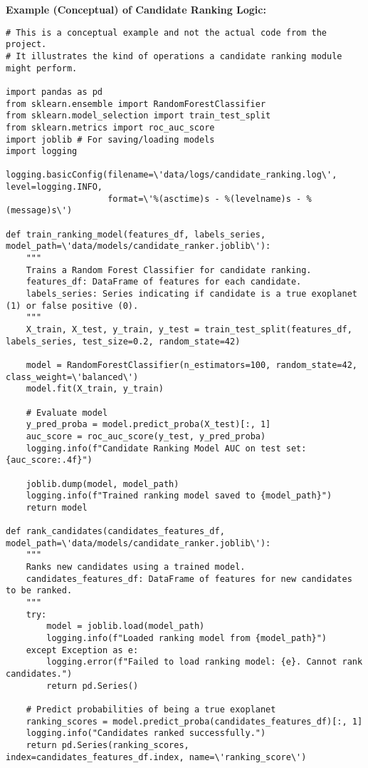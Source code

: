\documentclass{article}
\begin{document}
\textbf{Example (Conceptual) of Candidate Ranking Logic:}
\begin{lstlisting}[caption={Conceptual Candidate Ranking Logic}]
# This is a conceptual example and not the actual code from the project.
# It illustrates the kind of operations a candidate ranking module might perform.

import pandas as pd
from sklearn.ensemble import RandomForestClassifier
from sklearn.model_selection import train_test_split
from sklearn.metrics import roc_auc_score
import joblib # For saving/loading models
import logging

logging.basicConfig(filename=\'data/logs/candidate_ranking.log\', level=logging.INFO,
                    format=\'%(asctime)s - %(levelname)s - %(message)s\')

def train_ranking_model(features_df, labels_series, model_path=\'data/models/candidate_ranker.joblib\'):
    """
    Trains a Random Forest Classifier for candidate ranking.
    features_df: DataFrame of features for each candidate.
    labels_series: Series indicating if candidate is a true exoplanet (1) or false positive (0).
    """
    X_train, X_test, y_train, y_test = train_test_split(features_df, labels_series, test_size=0.2, random_state=42)

    model = RandomForestClassifier(n_estimators=100, random_state=42, class_weight=\'balanced\')
    model.fit(X_train, y_train)

    # Evaluate model
    y_pred_proba = model.predict_proba(X_test)[:, 1]
    auc_score = roc_auc_score(y_test, y_pred_proba)
    logging.info(f"Candidate Ranking Model AUC on test set: {auc_score:.4f}")

    joblib.dump(model, model_path)
    logging.info(f"Trained ranking model saved to {model_path}")
    return model

def rank_candidates(candidates_features_df, model_path=\'data/models/candidate_ranker.joblib\'):
    """
    Ranks new candidates using a trained model.
    candidates_features_df: DataFrame of features for new candidates to be ranked.
    """
    try:
        model = joblib.load(model_path)
        logging.info(f"Loaded ranking model from {model_path}")
    except Exception as e:
        logging.error(f"Failed to load ranking model: {e}. Cannot rank candidates.")
        return pd.Series()

    # Predict probabilities of being a true exoplanet
    ranking_scores = model.predict_proba(candidates_features_df)[:, 1]
    logging.info("Candidates ranked successfully.")
    return pd.Series(ranking_scores, index=candidates_features_df.index, name=\'ranking_score\')


\end{lstlisting}
\end{document}

